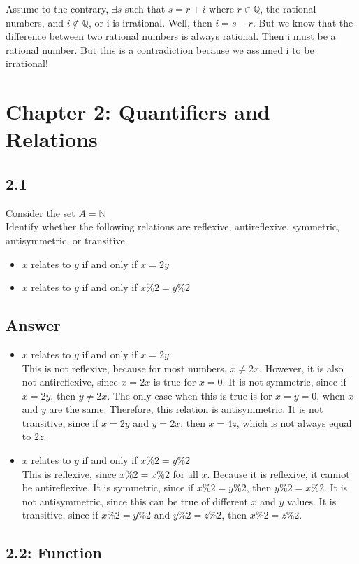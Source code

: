 \documentclass{article}
\begin{document}
Assume to the contrary, $\exists s$ such that $s = r + i$ where $r \in \mathbb{Q}$, the rational numbers, and $i \notin \mathbb{Q}$, or i is irrational.
Well, then $i = s - r$. But we know that the difference between two rational numbers is always rational. Then i must be a rational number. But this is a contradiction
because we assumed i to be irrational! 
\newpage
\section*{Chapter 2: Quantifiers and Relations}
\subsection*{2.1}
Consider the set $A=\mathbb{N}$
\\ Identify whether the following relations are reflexive, antireflexive, symmetric, antisymmetric, or transitive.
\begin{itemize}
    \item $x$ relates to $y$ if and only if $x=2y$ 
    \item $x$ relates to $y$ if and only if $x\%2=y\%2$
\end{itemize}
\newpage
\subsection*{Answer}
\begin{itemize}
    \item $x$ relates to $y$ if and only if $x=2y$
    \\ This is not reflexive, because for most numbers, $x\neq 2x$. However, it is also not antireflexive, since $x=2x$ is true for $x=0$. It is not symmetric, since if $x=2y$, then $y\neq2x$. The only case when this is true is for $x=y=0$, when $x$ and $y$ are the same. Therefore, this relation is antisymmetric. It is not transitive, since if $x=2y$ and $y=2x$, then $x=4z$, which is not always equal to $2z$.
    \item $x$ relates to $y$ if and only if $x\%2=y\%2$
    \\ This is reflexive, since $x\%2=x\%2$ for all $x$. Because it is reflexive, it cannot be antireflexive. It is symmetric, since if $x\%2=y\%2$, then   $y\%2=x\%2$. It is not antisymmetric, since this can be true of different $x$ and $y$ values. It is transitive, since if $x\%2=y\%2$ and $y\%2=z\%2$, then $x\%2=z\%2$.
\end{itemize}
\newpage
\subsection*{2.2: Function}
\end{document}
